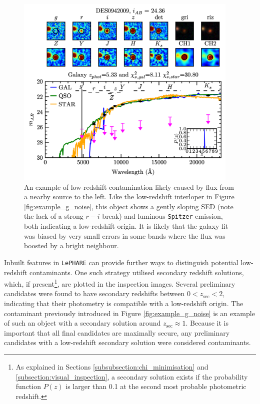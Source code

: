 \begin{figure}[tb]
\centering
\includegraphics[width=0.95\textwidth]{Chapter4/Figs/DES0942009_thesis.png}
\caption[Example of a low-redshift contaminant]{An example of low-redshift contamination likely caused by flux from a nearby source to the left. Like the low-redshift interloper in Figure \ref{fig:example_g_noise}, this object shows a gently sloping SED (note the lack of a strong $r-i$ break) and luminous \texttt{Spitzer} emission, both indicating a low-redshift origin. It is likely that the galaxy fit was biased by very small errors in some bands where the flux was boosted by a bright neighbour. }
\label{fig:example_low_z}
\end{figure}


Inbuilt features in \texttt{LePHARE} can provide further ways to distinguish potential low-redshift contaminants. One such strategy utilised secondary redshift solutions, which, if present\footnote{As explained in Sections \ref{subsubsection:chi_minimisation} and \ref{subsection:visual_inspection}, a secondary solution exists if the probability function $P(z)$ is larger than 0.1 at the second most probable photometric redshift.}, are plotted in the inspection images. Several preliminary candidates were found to have secondary redshifts between $0<z_{\mathrm{sec}}<2$, indicating that their photometry is compatible with a low-redshift origin. The contaminant previously introduced in Figure \ref{fig:example_g_noise} is an example of such an object with a secondary solution around $z_{\mathrm{sec}}\approx1$. Because it is important that all final candidates are maximally secure, any preliminary candidates with a low-redshift secondary solution were considered contaminants. \par 

